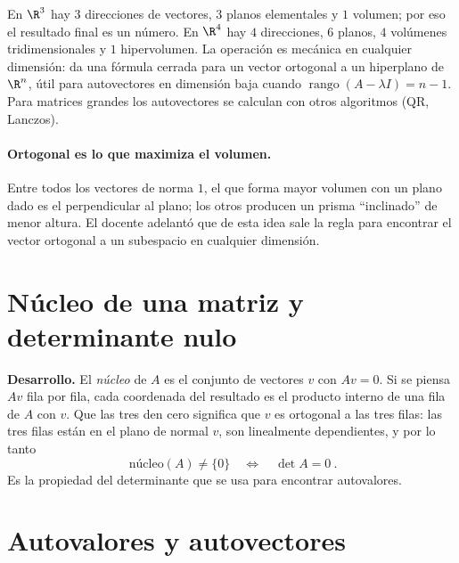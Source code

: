 \begin{idea}
En \(\R^3\) hay \(3\) direcciones de vectores, \(3\) planos elementales y \(1\) volumen; por
eso el resultado final es un número. En \(\R^4\) hay \(4\) direcciones, \(6\) planos, \(4\)
volúmenes tridimensionales y \(1\) hipervolumen. La operación es mecánica en cualquier
dimensión: da una fórmula cerrada para un vector ortogonal a un hiperplano de \(\R^n\), útil
para autovectores en dimensión baja cuando \(\operatorname{rango}(A-\lambda I)=n-1\). Para
matrices grandes los autovectores se calculan con otros algoritmos (QR, Lanczos).
\end{idea}

\paragraph{Ortogonal es lo que maximiza el volumen.} Entre todos los vectores de norma
\(1\), el que forma mayor volumen con un plano dado es el perpendicular al plano; los otros
producen un prisma ``inclinado'' de menor altura. El docente adelantó que de esta idea sale
la regla para encontrar el vector ortogonal a un subespacio en cualquier dimensión.

\section{Núcleo de una matriz y determinante nulo}\label{sec:nucleo}

{\small\vspace{1mm}\par}


\textbf{Desarrollo.} El \emph{núcleo} de \(A\) es el conjunto de vectores \(v\) con
\(Av=0\). Si se piensa \(Av\) fila por fila, cada coordenada del resultado es el producto
interno de una fila de \(A\) con \(v\). Que las tres den cero significa que \(v\) es
ortogonal a las tres filas: las tres filas están en el plano de normal \(v\), son linealmente
dependientes, y por lo tanto
\[
  \boxed{\ \text{núcleo}(A)\neq\{0\}\quad\Longleftrightarrow\quad\det A=0\ }.
\]
Es la propiedad del determinante que se usa para encontrar autovalores.

\section{Autovalores y autovectores}\label{sec:autovalores}

